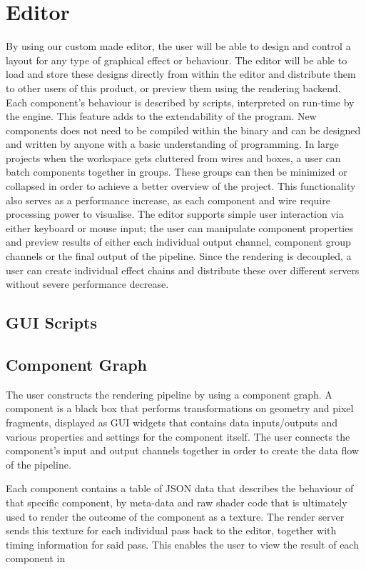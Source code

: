 
\chapter{Editor}
 
By using our custom made editor, the user will be able to design and control a layout for any type of graphical effect or behaviour. The editor will be able to load and store these designs directly from within the editor and distribute them to other users of this product, or preview them using the rendering backend. 
Each component’s behaviour is described by scripts, interpreted on run-time by the engine. This feature adds to the extendability of the program. New components does not need to be compiled within the binary and can be designed and written by anyone with a basic understanding of programming.
In large projects when the workspace gets cluttered from wires and boxes, a user can batch components together in groups. These groups can then be minimized or collapsed in order to achieve a better overview of the project. This functionality also serves as a performance increase, as each component and wire require processing power to visualise. 
The editor supports simple user interaction via either keyboard or mouse input; the user can manipulate component properties and preview results of either each individual output channel, component group channels or the final output of the pipeline. Since the rendering is decoupled, a user can create individual effect chains and distribute these over different servers without severe performance decrease. 

\section{GUI Scripts}

\section{Component Graph}
The user constructs the rendering pipeline by using a component graph. A component is a black box that performs transformations on geometry and pixel fragments, displayed as GUI widgets that contains data inputs/outputs and various properties and settings for the component itself. The user connects the component’s input and output channels together in order to create the data flow of the pipeline. 

Each component contains a table of JSON data that describes the behaviour of that specific component, by meta-data and raw shader code that is ultimately used to render the outcome of the component as a texture. The render server sends this texture for each individual pass back to the editor, together with timing information for said pass. This enables the user to view the result of each component in 

